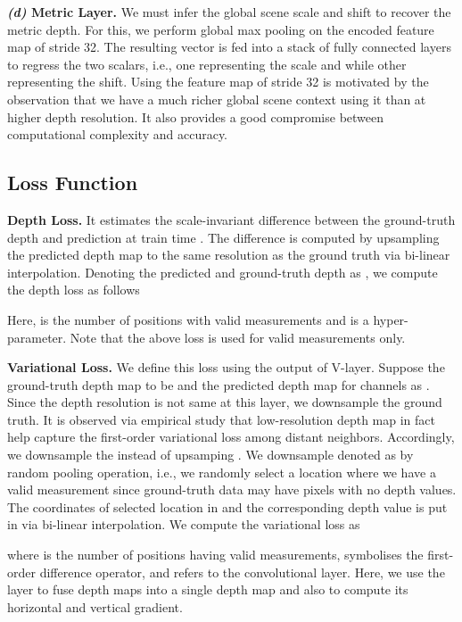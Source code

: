 \documentclass{article} \usepackage{iclr2023_conference, times}
\newcommand{\formattedparagraph}[1]{\noindent \textbf{#1}}
\begin{document}
\formattedparagraph{\textit{(d)} Metric Layer.} 
We must infer the global scene scale and shift to recover the metric depth. For this, we perform global max pooling on the encoded feature map of stride 32. The resulting vector is fed into a stack of fully connected layers to regress the two scalars, i.e., one representing the scale and while other representing the shift. Using the feature map of stride 32 is motivated by the observation that we have a much richer global scene context using it than at higher depth resolution. It also provides a good compromise between computational complexity and accuracy.





\subsection{Loss Function}\label{sec:loss}

\formattedparagraph{Depth Loss.} It estimates the scale-invariant difference between the ground-truth depth and prediction at train time \citep{eigen2014depth}. The difference is computed by upsampling the predicted depth map to the same resolution as the ground truth via bi-linear interpolation. Denoting the predicted and ground-truth depth as ,  we compute the depth loss as follows 

Here,  is the number of positions with valid measurements and  is a hyper-parameter. Note that the above loss is used for valid measurements only.



\formattedparagraph{Variational Loss.} We define this loss using the output of  V-layer. Suppose the ground-truth depth map to be  and the predicted depth map for  channels as . Since the depth resolution is not same at this layer, we downsample the ground truth. It is observed via empirical study that low-resolution depth map in fact help capture the  first-order variational loss among distant neighbors. Accordingly, we downsample the  instead of upsamping .  We  downsample  denoted as  by random pooling operation, i.e., we randomly select a location where we have a valid measurement since ground-truth data may have pixels with no depth values. The coordinates of selected location in  and the corresponding depth value is put in   via bi-linear interpolation. We compute the variational loss as 

where  is the number of positions having valid measurements,  symbolises the first-order difference operator, and  refers to the convolutional layer. Here, we use the  layer to fuse  depth maps into a single depth map and also to compute its horizontal and vertical gradient.
\end{document}
